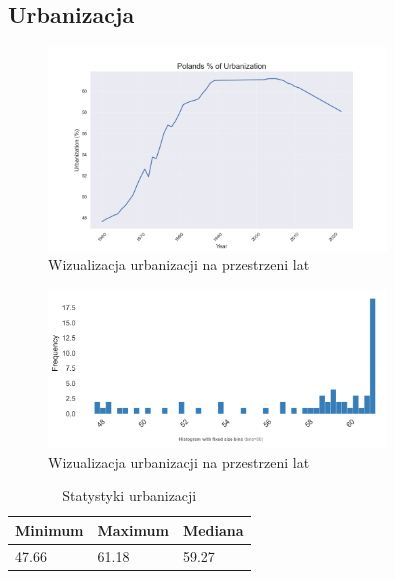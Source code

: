 \documentclass[11pt]{article}
\begin{document}
\subsection{Urbanizacja}
\begin{figure}[H]
        \centering
        \includegraphics[width=0.8\textwidth]{polish_urbanization.png}
        \caption{Wizualizacja urbanizacji na przestrzeni lat}
\end{figure}
\begin{figure}[H]
        \centering
        \includegraphics[width=0.8\textwidth]{images/histogram_urbanizacja.png}
        \caption{Wizualizacja urbanizacji na przestrzeni lat}
\end{figure}
\begin{table}[H]
        \centering
        \begin{tabular}{|l|l|l|}
        \hline
        Minimum & Maximum & Mediana \\ \hline
        47.66 & 61.18 & 59.27 \\ \hline
        \end{tabular}
        \caption{Statystyki urbanizacji}
        \end{table}
\end{document}
